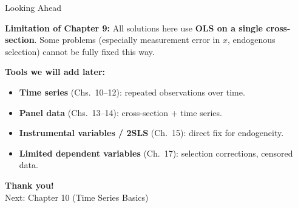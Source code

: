 \documentclass[aspectratio=169, 12pt]{beamer}
\begin{document}
\begin{frame}[shrink=15]{Looking Ahead}

  \begin{keybox}
    \textbf{Limitation of Chapter 9:} All solutions here use \textbf{OLS on a single
    cross-section}. Some problems (especially measurement error in $x$, endogenous
    selection) cannot be fully fixed this way.
  \end{keybox}

  \begin{highlightbox}
    \textbf{Tools we will add later:}
    \begin{itemize}\setlength{\itemsep}{2pt}
      \item \textbf{Time series} (Chs.~10--12): repeated observations over time.
      \item \textbf{Panel data} (Chs.~13--14): cross-section + time series.
      \item \textbf{Instrumental variables / 2SLS} (Ch.~15): direct fix for endogeneity.
      \item \textbf{Limited dependent variables} (Ch.~17): selection corrections, censored
      data.
    \end{itemize}
  \end{highlightbox}

  \begin{center}
  \vspace{0.5em}
  {\Huge \textcolor{SUFEGold}{\textbf{Thank you!}}}\\[0.5em]
  \large Next: Chapter 10 (Time Series Basics)
  \end{center}

\end{frame}
\end{document}
